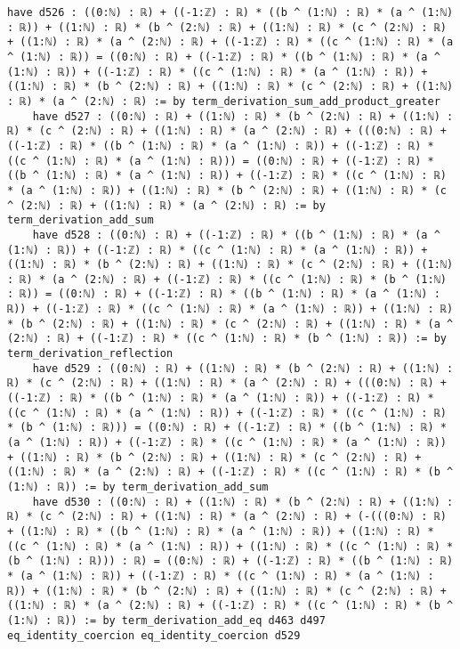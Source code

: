 \documentclass{article}
\begin{document}
\begin{tcolorbox}[colback=white!10, width=\linewidth]
\begin{lstlisting}[language=Lean4]
    have d526 : ((0:ℕ) : ℝ) + ((-1:ℤ) : ℝ) * ((b ^ (1:ℕ) : ℝ) * (a ^ (1:ℕ) : ℝ)) + ((1:ℕ) : ℝ) * (b ^ (2:ℕ) : ℝ) + ((1:ℕ) : ℝ) * (c ^ (2:ℕ) : ℝ) + ((1:ℕ) : ℝ) * (a ^ (2:ℕ) : ℝ) + ((-1:ℤ) : ℝ) * ((c ^ (1:ℕ) : ℝ) * (a ^ (1:ℕ) : ℝ)) = ((0:ℕ) : ℝ) + ((-1:ℤ) : ℝ) * ((b ^ (1:ℕ) : ℝ) * (a ^ (1:ℕ) : ℝ)) + ((-1:ℤ) : ℝ) * ((c ^ (1:ℕ) : ℝ) * (a ^ (1:ℕ) : ℝ)) + ((1:ℕ) : ℝ) * (b ^ (2:ℕ) : ℝ) + ((1:ℕ) : ℝ) * (c ^ (2:ℕ) : ℝ) + ((1:ℕ) : ℝ) * (a ^ (2:ℕ) : ℝ) := by term_derivation_sum_add_product_greater
    have d527 : ((0:ℕ) : ℝ) + ((1:ℕ) : ℝ) * (b ^ (2:ℕ) : ℝ) + ((1:ℕ) : ℝ) * (c ^ (2:ℕ) : ℝ) + ((1:ℕ) : ℝ) * (a ^ (2:ℕ) : ℝ) + (((0:ℕ) : ℝ) + ((-1:ℤ) : ℝ) * ((b ^ (1:ℕ) : ℝ) * (a ^ (1:ℕ) : ℝ)) + ((-1:ℤ) : ℝ) * ((c ^ (1:ℕ) : ℝ) * (a ^ (1:ℕ) : ℝ))) = ((0:ℕ) : ℝ) + ((-1:ℤ) : ℝ) * ((b ^ (1:ℕ) : ℝ) * (a ^ (1:ℕ) : ℝ)) + ((-1:ℤ) : ℝ) * ((c ^ (1:ℕ) : ℝ) * (a ^ (1:ℕ) : ℝ)) + ((1:ℕ) : ℝ) * (b ^ (2:ℕ) : ℝ) + ((1:ℕ) : ℝ) * (c ^ (2:ℕ) : ℝ) + ((1:ℕ) : ℝ) * (a ^ (2:ℕ) : ℝ) := by term_derivation_add_sum
    have d528 : ((0:ℕ) : ℝ) + ((-1:ℤ) : ℝ) * ((b ^ (1:ℕ) : ℝ) * (a ^ (1:ℕ) : ℝ)) + ((-1:ℤ) : ℝ) * ((c ^ (1:ℕ) : ℝ) * (a ^ (1:ℕ) : ℝ)) + ((1:ℕ) : ℝ) * (b ^ (2:ℕ) : ℝ) + ((1:ℕ) : ℝ) * (c ^ (2:ℕ) : ℝ) + ((1:ℕ) : ℝ) * (a ^ (2:ℕ) : ℝ) + ((-1:ℤ) : ℝ) * ((c ^ (1:ℕ) : ℝ) * (b ^ (1:ℕ) : ℝ)) = ((0:ℕ) : ℝ) + ((-1:ℤ) : ℝ) * ((b ^ (1:ℕ) : ℝ) * (a ^ (1:ℕ) : ℝ)) + ((-1:ℤ) : ℝ) * ((c ^ (1:ℕ) : ℝ) * (a ^ (1:ℕ) : ℝ)) + ((1:ℕ) : ℝ) * (b ^ (2:ℕ) : ℝ) + ((1:ℕ) : ℝ) * (c ^ (2:ℕ) : ℝ) + ((1:ℕ) : ℝ) * (a ^ (2:ℕ) : ℝ) + ((-1:ℤ) : ℝ) * ((c ^ (1:ℕ) : ℝ) * (b ^ (1:ℕ) : ℝ)) := by term_derivation_reflection
    have d529 : ((0:ℕ) : ℝ) + ((1:ℕ) : ℝ) * (b ^ (2:ℕ) : ℝ) + ((1:ℕ) : ℝ) * (c ^ (2:ℕ) : ℝ) + ((1:ℕ) : ℝ) * (a ^ (2:ℕ) : ℝ) + (((0:ℕ) : ℝ) + ((-1:ℤ) : ℝ) * ((b ^ (1:ℕ) : ℝ) * (a ^ (1:ℕ) : ℝ)) + ((-1:ℤ) : ℝ) * ((c ^ (1:ℕ) : ℝ) * (a ^ (1:ℕ) : ℝ)) + ((-1:ℤ) : ℝ) * ((c ^ (1:ℕ) : ℝ) * (b ^ (1:ℕ) : ℝ))) = ((0:ℕ) : ℝ) + ((-1:ℤ) : ℝ) * ((b ^ (1:ℕ) : ℝ) * (a ^ (1:ℕ) : ℝ)) + ((-1:ℤ) : ℝ) * ((c ^ (1:ℕ) : ℝ) * (a ^ (1:ℕ) : ℝ)) + ((1:ℕ) : ℝ) * (b ^ (2:ℕ) : ℝ) + ((1:ℕ) : ℝ) * (c ^ (2:ℕ) : ℝ) + ((1:ℕ) : ℝ) * (a ^ (2:ℕ) : ℝ) + ((-1:ℤ) : ℝ) * ((c ^ (1:ℕ) : ℝ) * (b ^ (1:ℕ) : ℝ)) := by term_derivation_add_sum
    have d530 : ((0:ℕ) : ℝ) + ((1:ℕ) : ℝ) * (b ^ (2:ℕ) : ℝ) + ((1:ℕ) : ℝ) * (c ^ (2:ℕ) : ℝ) + ((1:ℕ) : ℝ) * (a ^ (2:ℕ) : ℝ) + (-(((0:ℕ) : ℝ) + ((1:ℕ) : ℝ) * ((b ^ (1:ℕ) : ℝ) * (a ^ (1:ℕ) : ℝ)) + ((1:ℕ) : ℝ) * ((c ^ (1:ℕ) : ℝ) * (a ^ (1:ℕ) : ℝ)) + ((1:ℕ) : ℝ) * ((c ^ (1:ℕ) : ℝ) * (b ^ (1:ℕ) : ℝ))) : ℝ) = ((0:ℕ) : ℝ) + ((-1:ℤ) : ℝ) * ((b ^ (1:ℕ) : ℝ) * (a ^ (1:ℕ) : ℝ)) + ((-1:ℤ) : ℝ) * ((c ^ (1:ℕ) : ℝ) * (a ^ (1:ℕ) : ℝ)) + ((1:ℕ) : ℝ) * (b ^ (2:ℕ) : ℝ) + ((1:ℕ) : ℝ) * (c ^ (2:ℕ) : ℝ) + ((1:ℕ) : ℝ) * (a ^ (2:ℕ) : ℝ) + ((-1:ℤ) : ℝ) * ((c ^ (1:ℕ) : ℝ) * (b ^ (1:ℕ) : ℝ)) := by term_derivation_add_eq d463 d497 eq_identity_coercion eq_identity_coercion d529

\end{lstlisting}
\end{tcolorbox}
\end{document}
